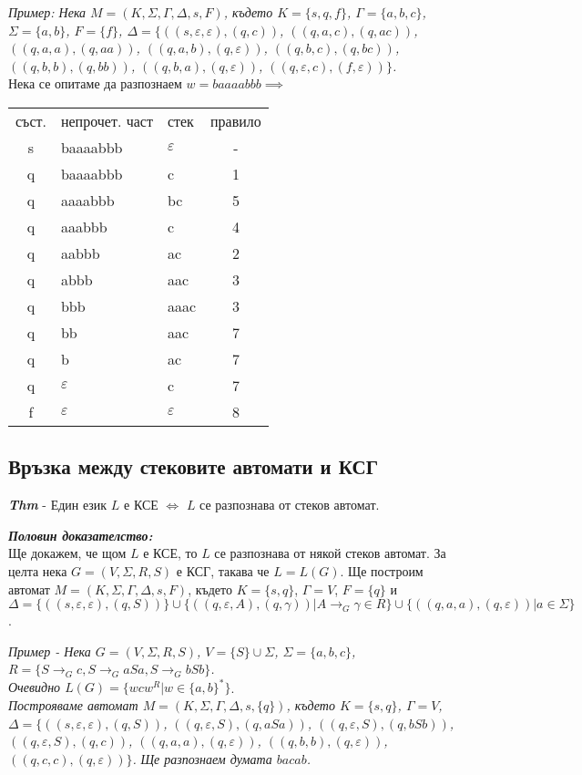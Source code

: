 \documentclass[fleqn,12pt]{article}
\begin{document}
\begin{flushleft}
\textit{Пример: Нека $M = (K, \Sigma, \Gamma, \Delta, s, F)$, където $K = \{s, q, f\}$, $\Gamma = \{a, b, c\}$, $\Sigma = \{a, b\}$, $F = \{f\}$, $\Delta = \{$$((s, \varepsilon, \varepsilon), (q, c))$, $((q, a, c), (q, ac))$, $((q, a, a), (q, aa))$, $((q, a, b), (q, \varepsilon))$, $((q, b, c), (q, bc))$, $((q, b, b), (q, bb))$, $((q, b, a), (q, \varepsilon))$, $((q, \varepsilon, c), (f, \varepsilon))$$\}$.} \\

Нека се опитаме да разпознаем $w = baaaabbb \implies$

\begin{tabular}{ |c|l|l|c| } 
 \hline
 съст. & непрочет. част & стек & правило \\ 
 s & baaaabbb & $\varepsilon$ & - \\
 q & baaaabbb & c & 1 \\
 q & aaaabbb & bc & 5 \\
 q & aaabbb & c & 4 \\
 q & aabbb & ac & 2 \\
 q & abbb & aac & 3 \\
 q & bbb & aaac & 3 \\
 q & bb & aac & 7 \\
 q & b & ac & 7 \\
 q & $\varepsilon$ & c & 7 \\
 f & $\varepsilon$ & $\varepsilon$ & 8 \\
 \hline
\end{tabular}

\subsection{Връзка между стековите автомати и КСГ}

\textit{\textbf{Thm}} - Един език $L$ е КСЕ $\iff$ $L$ се разпознава от стеков автомат.

\textit{\textbf{Половин доказателство:}} \\

Ще докажем, че щом $L$ е КСЕ, то $L$ се разпознава от някой стеков автомат. За целта нека $G = (V, \Sigma, R, S)$ е КСГ, такава че $L = L(G)$. Ще построим автомат $M = (K, \Sigma, \Gamma, \Delta, s, F)$, където $K = \{s, q\}$, $\Gamma = V$, $F = \{q\}$ и $\Delta = \{((s, \varepsilon, \varepsilon), (q, S))\} \cup \{((q, \varepsilon, A), (q, \gamma)) | A \to_G \gamma \in R\} \cup \{((q, a, a), (q, \varepsilon)) | a \in \Sigma\}$.

\textit{Пример - Нека $G = (V, \Sigma, R, S)$, $V = \{S\} \cup \Sigma$, $\Sigma = \{a, b, c\}$, $R = \{S \to_G c, S \to_G aSa, S \to_G bSb\}$.} \\
\textit{Очевидно $L(G) = \{wcw^R | w \in \{a, b\}^*\}$}. \\
\textit{Построяваме автомат $M = (K, \Sigma, \Gamma, \Delta, s, \{q\})$, където $K = \{s, q\}$, $\Gamma = V$, $\Delta = \{$$((s, \varepsilon, \varepsilon), (q, S))$, $((q, \varepsilon, S), (q, aSa))$, $((q, \varepsilon, S), (q, bSb))$, $((q, \varepsilon, S), (q, c))$, $((q, a, a), (q, \varepsilon))$, $((q, b, b), (q, \varepsilon))$, $((q, c, c), (q, \varepsilon))$$\}$.}
\textit{Ще разпознаем думата $bacab$.}


\end{flushleft}
\end{document}
